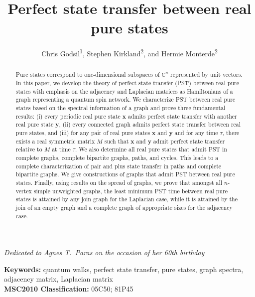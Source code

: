 \documentclass[11pt]{article}
\newcommand{\bx}{\mathbf x}
\newcommand{\by}{\mathbf y}
\begin{document}
\title{Perfect state transfer between real pure states}

\author{Chris Godsil\textsuperscript{1}, Stephen Kirkland\textsuperscript{2}, and Hermie Monterde\textsuperscript{2}
}


\maketitle

\begin{center}
{\textit{Dedicated to Agnes T.\ Paras on the occasion of her 60th birthday}}
\end{center}

\begin{abstract}
Pure states correspond to one-dimensional subspaces of $\mathbb{C}^n$ represented by unit vectors. In this paper, we develop the theory of perfect state transfer (PST) between real pure states with emphasis on the adjacency and Laplacian matrices as Hamiltonians of a graph representing a quantum spin network. We characterize PST between real pure states based on the spectral information of a graph and prove three fundamental results: (i) every periodic real pure state $\bx$ admits perfect state transfer with another real pure state $\by$, (ii) every connected graph admits perfect state transfer between real pure states, and (iii) for any pair of real pure states $\bx$ and $\by$ and for any time $\tau$, there exists a real symmetric matrix $M$ such that $\bx$ and $\by$ admit perfect state transfer relative to $M$ at time $\tau$. We also determine all real pure states that admit PST in complete graphs, complete bipartite graphs, paths, and cycles. This leads to a complete characterization of pair and plus state transfer in paths and complete bipartite graphs. We give constructions of graphs that admit PST between real pure states. Finally, using results on the spread of graphs, we prove that amongst all $n$-vertex simple unweighted graphs, the least minimum PST time between real pure states is attained by any join graph for the Laplacian case, while it is attained by the join of an empty graph and a complete graph of appropriate sizes for the adjacency case.
\end{abstract}

\noindent \textbf{Keywords:} quantum walks, perfect state transfer, pure states, graph spectra, adjacency matrix, Laplacian matrix\\
	
\noindent \textbf{MSC2010 Classification:} 
05C50; 81P45
\end{document}
